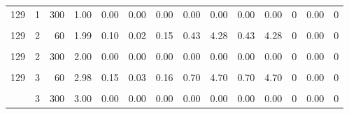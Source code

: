 \begin{table}
\begin{tabular}{rrrrrrrrrrrrrr}
129 & 1 & 300 & 1.00 & 0.00 & 0.00 & 0.00 & 0.00 & 0.00 & 0.00 & 0.00 & 0 & 0.00 & 0\\
\cellcolor{gray!6}{129} & \cellcolor{gray!6}{2} & \cellcolor{gray!6}{30} & \cellcolor{gray!6}{1.28} & \cellcolor{gray!6}{0.68} & \cellcolor{gray!6}{0.96} & \cellcolor{gray!6}{0.81} & \cellcolor{gray!6}{22.79} & \cellcolor{gray!6}{21.49} & \cellcolor{gray!6}{22.79} & \cellcolor{gray!6}{21.49} & \cellcolor{gray!6}{0} & \cellcolor{gray!6}{0.03} & \cellcolor{gray!6}{0}\\
129 & 2 & 60 & 1.99 & 0.10 & 0.02 & 0.15 & 0.43 & 4.28 & 0.43 & 4.28 & 0 & 0.00 & 0\\
\addlinespace
\cellcolor{gray!6}{129} & \cellcolor{gray!6}{2} & \cellcolor{gray!6}{120} & \cellcolor{gray!6}{2.00} & \cellcolor{gray!6}{0.00} & \cellcolor{gray!6}{0.00} & \cellcolor{gray!6}{0.00} & \cellcolor{gray!6}{0.00} & \cellcolor{gray!6}{0.00} & \cellcolor{gray!6}{0.00} & \cellcolor{gray!6}{0.00} & \cellcolor{gray!6}{0} & \cellcolor{gray!6}{0.00} & \cellcolor{gray!6}{0}\\
129 & 2 & 300 & 2.00 & 0.00 & 0.00 & 0.00 & 0.00 & 0.00 & 0.00 & 0.00 & 0 & 0.00 & 0\\
\cellcolor{gray!6}{129} & \cellcolor{gray!6}{3} & \cellcolor{gray!6}{30} & \cellcolor{gray!6}{1.92} & \cellcolor{gray!6}{0.86} & \cellcolor{gray!6}{1.05} & \cellcolor{gray!6}{0.74} & \cellcolor{gray!6}{35.28} & \cellcolor{gray!6}{31.28} & \cellcolor{gray!6}{27.50} & \cellcolor{gray!6}{20.53} & \cellcolor{gray!6}{0} & \cellcolor{gray!6}{0.03} & \cellcolor{gray!6}{0}\\
129 & 3 & 60 & 2.98 & 0.15 & 0.03 & 0.16 & 0.70 & 4.70 & 0.70 & 4.70 & 0 & 0.00 & 0\\
\cellcolor{gray!6}{129} & \cellcolor{gray!6}{3} & \cellcolor{gray!6}{120} & \cellcolor{gray!6}{3.00} & \cellcolor{gray!6}{0.00} & \cellcolor{gray!6}{0.00} & \cellcolor{gray!6}{0.00} & \cellcolor{gray!6}{0.00} & \cellcolor{gray!6}{0.00} & \cellcolor{gray!6}{0.00} & \cellcolor{gray!6}{0.00} & \cellcolor{gray!6}{0} & \cellcolor{gray!6}{0.00} & \cellcolor{gray!6}{0}\\
\addlinespace
129 & 3 & 300 & 3.00 & 0.00 & 0.00 & 0.00 & 0.00 & 0.00 & 0.00 & 0.00 & 0 & 0.00 & 0\\
\bottomrule
\end{tabular}
\end{table}
